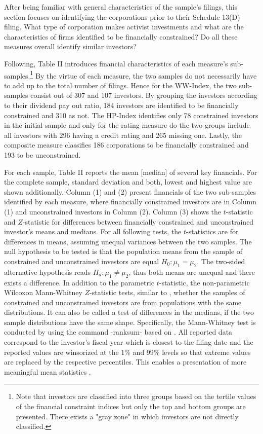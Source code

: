 \documentclass[12pt]{article}
\begin{document}
\noindent After being familiar with general characteristics of the sample's filings, this section focuses on identifying the corporations prior to their Schedule 13(D) filing. What type of corporation makes activist investments and what are the characteristics of firms identified to be financially constrained? Do all these measures overall identify similar investors?\par
Following, Table II introduces financial characteristics of each measure's sub-samples.\footnote{Note that investors are classified into three groups based on the tertile values of the financial constraint indices but only the top and bottom groups are presented. There exists a "gray zone" in which investors are not directly classified.} By the virtue of each measure, the two samples do not necessarily have to add up to the total number of filings. Hence for the WW-Index, the two sub-samples consist out of 307 and 107 investors. By grouping the investors according to their dividend pay out ratio, 184 investors are identified to be financially constrained and 310 as not. The HP-Index identifies only 78 constrained investors in the initial sample and only for the rating measure do the two groups include all investors with 296 having a credit rating and 265 missing one. Lastly, the composite measure classifies 186 corporations to be financially constrained and 193 to be unconstrained.\par
For each sample, Table II reports the mean [median] of several key financials. For the complete sample, standard deviation and both, lowest and highest value are shown additionally. Column (1) and (2) present financials of the two sub-samples identified by each measure, where financially constrained investors are in Column (1) and unconstrained investors in Column (2). Column (3) shows the $t$-statistic and $Z$-statistic for differences between financially constrained and unconstrained investor's means and medians. For all following tests, the $t$-statistics are for differences in means, assuming unequal variances between the two samples. The null hypothesis to be tested is that the population means from the sample of constrained and unconstrained investors are equal $H_{0}: \mu_{1}=\mu_{2}$. The two-sided alternative hypothesis reads $H_{a}: \mu_{1}\neq\mu_{2}$, thus both means are unequal and there exists a difference. In addition to the parametric $t$-statistic, the non-parametric Wilcoxon Mann-Whitney $Z$-statistic tests, similar to \citet[p.201]{Klein2009}, whether the samples of constrained and unconstrained investors are from populations with the same distributions. It can also be called a test of differences in the medians, if the two sample distributions have the same shape. Specifically, the Mann-Whitney test is conducted by using the command -ranksum- based on \citet[p.59]{Mann1947}. All reported data correspond to the investor's fiscal year which is closest to the filing date and the reported values are winsorized at the 1\% and 99\% levels so that extreme values are replaced by the respective percentiles. This enables a presentation of more meaningful mean statistics \citep[p.203]{Klein2009}.   
\end{document}
